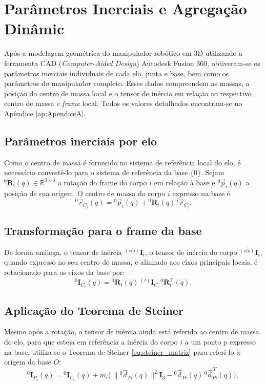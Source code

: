 \section{Parâmetros Inerciais e Agregação Dinâmic}
Após a modelagem geométrica do manipulador robótico em 3D utilizando a ferramenta CAD (\emph{Computer-Aided Design}) Autodesk Fusion 360, obtiveram-se os parâmetros inerciais individuais de cada elo, junta e base, bem como os parâmetros do manipulador completo.
Esses dados compreendem as massas, a posição do centro de massa local e o tensor de inércia em relação ao respectivo centro de massa e \emph{frame} local. Todos os valores detalhados encontram-se no Apêndice \eqref{ap:ApendiceA}.

\subsection{Parâmetros inerciais por elo}
Como o centro de massa é fornecido no sistema de referência local do elo, é necessário convertê-lo para o sistema de referência da base $\{0\}$.
Sejam ${}^{0}\!\mathbf R_i(q)\in\mathbb{R}^{3\times 3}$ a rotação do frame do corpo $i$ em relação à base e ${}^{0}\!\vec p_i(q)$ a posição de sua origem. O centro de massa do corpo $i$ expresso na base é
\begin{equation}
{}^{0}\!\vec r_{C_i}(q)= {}^{0}\!\vec p_i(q)+{}^{0}\!\mathbf R_i(q)\,{}^{i}\!\vec r_{C_i}.
\label{eq:rci_base}
\end{equation}

\subsection{Transformação para o frame da base}
De forma análoga, o tensor de inércia ${}^{(elo)}\mathbf{I}_{i}$, o tensor de inércia do corpo ${}^{(elo)}\mathbf{I}_{i}$, quando expresso no seu centro de massa, e alinhado aos eixos principais locais, é rotacionado para os eixos da base por:
\begin{equation}
{}^{0}\!\mathbf I_{C_i}(q)= {}^{0}\!\mathbf R_i(q)\,{}^{(i)}\!\mathbf I_{C_i}\,{}^{0}\!\mathbf R_i^{\top}(q).
\label{eq:I_rot_base}
\end{equation}

\subsection{Aplicação do Teorema de Steiner}
Mesmo após a rotação, o tensor de inércia ainda está referido ao centro de massa do elo, para que esteja em referência a inércia do corpo $i$ a um ponto $p$ expresso na base, utiliza-se o Teorema de Steiner \eqref{eq:steiner_matriz} para referi-lo à origem da base $O$:
\begin{equation}
{}^{0}\!\mathbf I_{P_i}(q)
= {}^{0}\!\mathbf I_{C_i}(q)+ m_i\big(\,\|{}^{0}\!\vec d_{Pi}(q)\|^2\mathbf I_3-{}^{0}\!\vec d_{Pi}(q)\,{}^{0}\!\vec d_{Pi}^{\,T}(q)\big),
\label{eq:steiner_matriz}
\end{equation}

